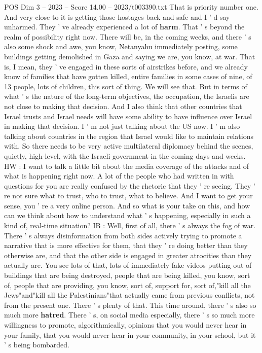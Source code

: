 \begin{textsample}{POS Dim 3 – 2023 – Score 14.00 – 2023/t003390.txt}
That is priority number one.
And very close to it is getting those hostages back and safe and I ' d say unharmed.
They ' ve already experienced a lot of \textbf{harm}.
That ' s beyond the realm of possibility right now.
There will be, in the coming weeks, and there ' s also some shock and awe, you know, Netanyahu immediately posting, some buildings getting demolished in Gaza and saying we are, you know, at war.
That is, I mean, they ' ve engaged in these sorts of airstrikes before, and we already know of families that have gotten killed, entire families in some cases of nine, of 13 people, lots of children, this sort of thing.
We will see that.
But in terms of what ' s the nature of the long-term objectives, the occupation, the Israelis are not close to making that decision.
And I also think that other countries that Israel trusts and Israel needs will have some ability to have influence over Israel in making that decision.
I ' m not just talking about the US now.
I ' m also talking about countries in the region that Israel would like to maintain relations with.
So there needs to be very active multilateral diplomacy behind the scenes, quietly, high-level, with the Israeli government in the coming days and weeks.
HW : I want to talk a little bit about the media coverage of the attacks and of what is happening right now.
A lot of the people who had written in with questions for you are really confused by the rhetoric that they ' re seeing.
They ' re not sure what to trust, who to trust, what to believe.
And I want to get your sense, you ' re a very online person.
And so what is your take on this, and how can we think about how to understand what ' s happening, especially in such a kind of, real-time situation?
IB : Well, first of all, there ' s always the fog of war.
There ' s always disinformation from both sides actively trying to promote a narrative that is more effective for them, that they ' re doing better than they otherwise are, and that the other side is engaged in greater atrocities than they actually are.
You see lots of that, lots of immediately fake videos putting out of buildings that are being destroyed, people that are being killed, you know, sort of, people that are providing, you know, sort of, support for, sort of,"kill all the Jews"and"kill all the Palestinians"that actually came from previous conflicts, not from the present one.
There ' s plenty of that.
This time around, there ' s also so much more \textbf{hatred}.
There ' s, on social media especially, there ' s so much more willingness to promote, algorithmically, opinions that you would never hear in your family, that you would never hear in your community, in your school, but it ' s being bombarded.

\end{textsample}
